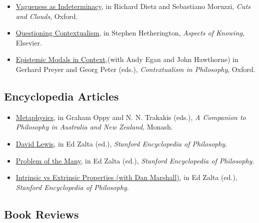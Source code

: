 \documentclass[
  10pt,
  letterpaper,
  DIV=11,
  numbers=noendperiod,
  twoside]{scrartcl}
\providecommand{\tightlist}{%
  \setlength{\itemsep}{0pt}\setlength{\parskip}{0pt}}
\begin{document}
\begin{itemize}
\item
  \href{https://brian.weatherson.org/quarto/posts/vai/vagueness-as-indeterminacy.html}{Vagueness
  as Indeterminacy}, in Richard Dietz and Sebastiano Moruzzi, \emph{Cuts
  and Clouds}, Oxford.
\item
  \href{https://brian.weatherson.org/quarto/posts/qc/questioning-contextualism.html}{Questioning
  Contextualism}, in Stephen Hetherington, \emph{Aspects of Knowing},
  Elsevier.
\item
  \href{https://brian.weatherson.org/quarto/posts/epic/epistemic-modals-in-context.html}{Epistemic
  Modals in Context},(with Andy Egan and John Hawthorne) in Gerhard
  Preyer and Georg Peter (eds.), \emph{Contextualism in Philosophy},
  Oxford.
\end{itemize}

\subsection{Encyclopedia Articles}\label{encyclopedia-articles}

\begin{itemize}
\tightlist
\item
  \href{http://www.publishing.monash.edu/cpanz/}{Metaphysics}, in Graham
  Oppy and N. N. Trakakis (eds.), \emph{A Companion to Philosophy in
  Australia and New Zealand}, Monash.
\item
  \href{http://plato.stanford.edu/entries/david-lewis/}{David Lewis}, in
  Ed Zalta (ed.), \emph{Stanford Encyclopedia of Philosophy}.
\item
  \href{http://plato.stanford.edu/entries/problem-of-many/}{Problem of
  the Many}, in Ed Zalta (ed.), \emph{Stanford Encyclopedia of
  Philosophy}.
\item
  \href{http://plato.stanford.edu/entries/intrinsic-extrinsic/}{Intrinsic
  vs Extrinsic Properties (with Dan Marshall)}, in Ed Zalta (ed.),
  \emph{Stanford Encyclopedia of Philosophy}.
\end{itemize}

\subsection{Book Reviews}\label{book-reviews}
\end{document}
